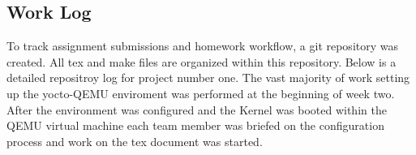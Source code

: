 \documentclass[10pt,onecolumn,draftclsnofoot]{IEEEtran} %
\begin{document}
\begin{singlespace}
\newpage
\section{\bf Work Log}
\normalfont \indent To track assignment submissions and homework workflow, a git repository was created. All tex and make files are organized within this repository. Below is a detailed repositroy log for project number one. The vast majority of work setting up the yocto-QEMU enviroment was performed at the beginning of week two. After the environment was configured and the Kernel was booted within the QEMU virtual machine each team member was briefed on the configuration process and work on the tex document was started. \hfill\break

        \begin{center}
                
        \end{center}


\end{singlespace}
\restoregeometry
\end{document}
